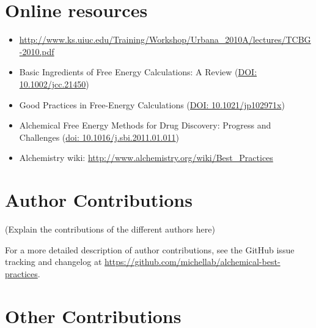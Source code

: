 \documentclass[9pt,bestpractices]{livecoms}
\newcommand{\githubrepository}{\url{https://github.com/michellab/alchemical-best-practices}}  %
\begin{document}
\section{Online resources}
\begin{itemize}
\item \url{http://www.ks.uiuc.edu/Training/Workshop/Urbana_2010A/lectures/TCBG-2010.pdf}
\item Basic Ingredients of Free Energy Calculations: A Review (\url{DOI: 10.1002/jcc.21450})
\item Good Practices in Free-Energy Calculations (\url{DOI: 10.1021/jp102971x})
\item Alchemical Free Energy Methods for Drug Discovery: Progress and Challenges (\url{doi: 10.1016/j.sbi.2011.01.011})
\item Alchemistry wiki: \url{http://www.alchemistry.org/wiki/Best_Practices}
\end{itemize}

\section*{Author Contributions}
%

(Explain the contributions of the different authors here)

For a more detailed description of author contributions,
see the GitHub issue tracking and changelog at \githubrepository.

\section*{Other Contributions}
%
\end{document}
